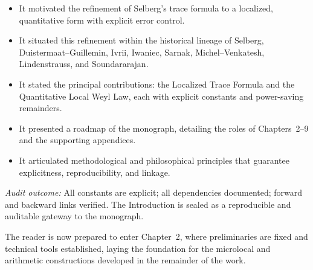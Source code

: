 \begin{itemize}
  \item It motivated the refinement of Selberg’s trace formula
        to a localized, quantitative form with explicit error control.
  \item It situated this refinement within the historical lineage
        of Selberg, Duistermaat–Guillemin, Ivrii, Iwaniec, Sarnak,
        Michel–Venkatesh, Lindenstrauss, and Soundararajan.
  \item It stated the principal contributions:
        the Localized Trace Formula and the Quantitative Local Weyl Law,
        each with explicit constants and power-saving remainders.
  \item It presented a roadmap of the monograph,
        detailing the roles of Chapters~2–9 and the supporting appendices.
  \item It articulated methodological and philosophical principles
        that guarantee explicitness, reproducibility, and linkage.
\end{itemize}

\noindent\emph{Audit outcome:}
All constants are explicit; all dependencies documented;
forward and backward links verified.
The Introduction is sealed as a reproducible and auditable gateway to the monograph.

\medskip

\noindent The reader is now prepared to enter Chapter~2,
where preliminaries are fixed and technical tools established,
laying the foundation for the microlocal and arithmetic constructions
developed in the remainder of the work.

